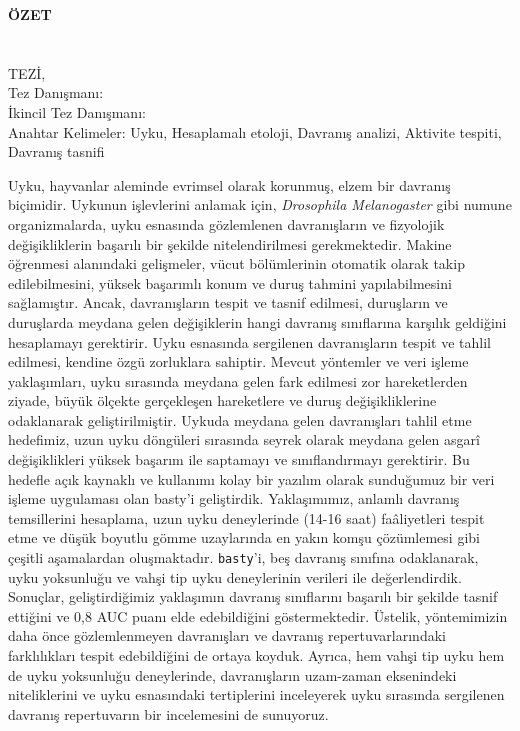 \clearpage\pagebreak
\begin{center}
	\MakeUppercase{\textbf{Özet}} \\ [3\baselineskip]
	\MakeUppercase{\thesistitletr} \\ [3\baselineskip]
	\MakeUppercase{\student} \\[\baselineskip]
	\MakeUppercase{\majortr \degreetr Tez\.{ı}, \monthtr~\year} \\[\baselineskip]
	Tez Danışmanı: \advisortr \\
	İkincil Tez Danışmanı: \coadvisortr \\
	[2\baselineskip]
	Anahtar Kelimeler: Uyku, Hesaplamalı etoloji, Davranış analizi, Aktivite tespiti, Davranış tasnifi
\end{center}

\singlespacing

Uyku, hayvanlar aleminde evrimsel olarak korunmuş, elzem bir davranış biçimidir.
Uykunun işlevlerini anlamak için, \textit{Drosophila Melanogaster} gibi numune organizmalarda, uyku esnasında gözlemlenen davranışların ve fizyolojik değişikliklerin başarılı bir şekilde nitelendirilmesi gerekmektedir.
Makine öğrenmesi alanındaki gelişmeler, vücut bölümlerinin otomatik olarak takip edilebilmesini, yüksek başarımlı konum ve duruş tahmini yapılabilmesini sağlamıştır.
Ancak, davranışların tespit ve tasnif edilmesi, duruşların ve duruşlarda meydana gelen değişiklerin hangi davranış sınıflarına karşılık geldiğini hesaplamayı gerektirir.
Uyku esnasında sergilenen davranışların tespit ve tahlil edilmesi, kendine özgü zorluklara sahiptir.
Mevcut yöntemler ve veri işleme yaklaşımları, uyku sırasında meydana gelen fark edilmesi zor hareketlerden ziyade, büyük ölçekte gerçekleşen hareketlere ve duruş değişikliklerine odaklanarak geliştirilmiştir.
Uykuda meydana gelen davranışları tahlil etme hedefimiz, uzun uyku döngüleri sırasında seyrek olarak meydana gelen asgarî değişiklikleri yüksek başarım ile saptamayı ve sınıflandırmayı gerektirir.
Bu hedefle açık kaynaklı ve kullanımı kolay bir yazılım olarak sunduğumuz bir veri işleme uygulaması olan basty’i geliştirdik.
Yaklaşımımız, anlamlı davranış temsillerini hesaplama, uzun uyku deneylerinde (14-16 saat) faâliyetleri tespit etme ve düşük boyutlu gömme uzaylarında en yakın komşu çözümlemesi gibi çeşitli aşamalardan oluşmaktadır.
\texttt{basty}'i, beş davranış sınıfına odaklanarak, uyku yoksunluğu ve vahşi tip uyku deneylerinin verileri ile değerlendirdik.
Sonuçlar, geliştirdiğimiz yaklaşımın davranış sınıflarını başarılı bir şekilde tasnif ettiğini ve 0,8 AUC puanı elde edebildiğini göstermektedir.
Üstelik, yöntemimizin daha önce gözlemlenmeyen davranışları ve davranış repertuvarlarındaki farklılıkları tespit edebildiğini de ortaya koyduk.
Ayrıca, hem vahşi tip uyku hem de uyku yoksunluğu deneylerinde, davranışların uzam-zaman eksenindeki niteliklerini ve uyku esnasındaki tertiplerini inceleyerek uyku sırasında sergilenen davranış repertuvarın bir incelemesini de sunuyoruz.

\onehalfspacing
